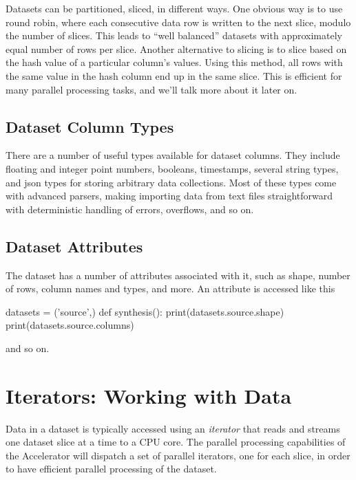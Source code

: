 Datasets can be partitioned, sliced, in different ways.  One obvious
way is to use round robin, where each consecutive data row is written
to the next slice, modulo the number of slices.  This leads to ``well
balanced'' datasets with approximately equal number of rows per slice.
Another alternative to slicing is to slice based on the hash value of
a particular column's values.  Using this method, all rows with the
same value in the hash column end up in the same slice.  This is
efficient for many parallel processing tasks, and we'll talk more
about it later on.



\subsection{Dataset Column Types}
\label{sec:dataset-typing}
There are a number of useful types available for dataset columns.
They include floating and integer point numbers, booleans, timestamps,
several string types, and json types for storing arbitrary data
collections.  Most of these types come with advanced parsers, making
importing data from text files straightforward with deterministic
handling of errors, overflows, and so on.



\subsection{Dataset Attributes}
The dataset has a number of attributes associated with it, such as
shape, number of rows, column names and types, and more.
An attribute is accessed like this
\begin{python}
datasets = ('source',)
def synthesis():
    print(datasets.source.shape)
    print(datasets.source.columns)
\end{python}
and so on.



\section{Iterators: Working with Data}

Data in a dataset is typically accessed using an \emph{iterator} that
reads and streams one dataset slice at a time to a CPU core.  The
parallel processing capabilities of the Accelerator will dispatch a
set of parallel iterators, one for each slice, in order to have
efficient parallel processing of the dataset.

